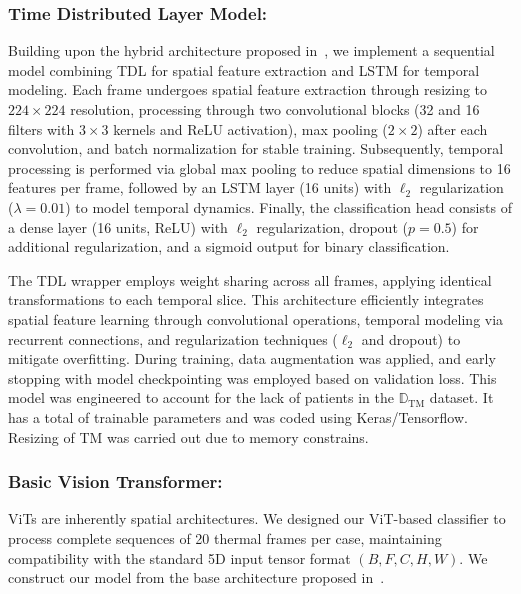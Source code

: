 \documentclass[runningheads]{llncs}
\begin{document}
\subsubsection{Time Distributed Layer Model:}
\label{sec:time-distr-layer}
Building upon the hybrid architecture proposed in~\cite{Dhage2025}, we
implement a sequential model combining \ac{TDL} for spatial feature
extraction and \ac{LSTM} for temporal modeling. Each frame undergoes
spatial feature extraction through resizing to $224\times224$
resolution, processing through two convolutional blocks (32 and 16
filters with $3\times3$ kernels and ReLU activation), max pooling
($2\times2$) after each convolution, and batch normalization for
stable training. Subsequently, temporal processing is performed via
global max pooling to reduce spatial dimensions to 16 features per
frame, followed by an LSTM layer (16 units) with $\ell_2$
regularization ($\lambda=0.01$) to model temporal dynamics. Finally,
the classification head consists of a dense layer (16 units, ReLU)
with $\ell_2$ regularization, dropout ($p=0.5$) for additional
regularization, and a sigmoid output for binary classification.

The \ac{TDL} wrapper employs weight sharing across all frames,
applying identical transformations to each temporal slice. This
architecture efficiently integrates spatial feature learning through
convolutional operations, temporal modeling via recurrent connections,
and regularization techniques ($\ell_2$ and dropout) to mitigate
overfitting. During training, data augmentation was applied, and early
stopping with model checkpointing was employed based on validation
loss. This model was engineered to account for the lack of patients in
the $\mathbb{D}_{\mathrm{TM}}$ dataset. It has a total of
 trainable parameters and was coded using
Keras/Tensorflow. Resizing of \ac{TM} was carried out due to memory
constrains.

\subsubsection{Basic Vision Transformer:}
\label{sec:basic-visi-transf}

\ac{ViTs} are inherently spatial architectures. We designed our
\ac{ViT}-based classifier to process complete sequences of 20 thermal
frames per case, maintaining compatibility with the standard 5D input
tensor format $(B, F, C, H, W)$. We construct our model from the base
architecture proposed in~\cite{dosovitskiy2020image}.
\end{document}
